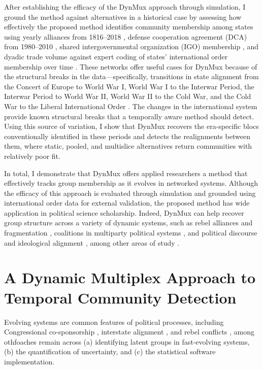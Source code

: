 \documentclass[11pt, letterpaper]{article}
\begin{document}
After establishing the efficacy of the DynMux approach through simulation, I ground the method against alternatives in a historical case by assessing how effectively the proposed method identifies community membership among states using yearly alliances from 1816--2018 \citep{leeds2002alliance}, defense cooperation agreement (DCA) from 1980--2010 \citep{kinne2020defense}, shared intergovernmental organization (IGO) membership \citep{pevehouse2020tracking, wallace1970intergovernmental}, and dyadic trade volume \citep{barbieri2009trading} against expert coding of states' international order membership over time \citep{braumoeller2019only}. These networks offer useful cases for DynMux because of the structural breaks in the data---specifically, transitions in state alignment from the Concert of Europe to World War I, World War I to the Interwar Period, the Interwar Period to World War II, World War II to the Cold War, and the Cold War to the Liberal International Order \citep{braumoeller2019only, ikenberry2018end}. The changes in the international system provide known structural breaks that a temporally aware method should detect. Using this source of variation, I show that DynMux recovers the era-specific blocs conventionally identified in these periods and detects the realignments between them, where static, pooled, and multislice alternatives return communities with relatively poor fit.

In total, I demonstrate that DynMux offers applied researchers a method that effectively tracks group membership as it evolves in networked systems. Although the efficacy of this approach is evaluated through simulation and grounded using international order data for external validation, the proposed method has wide application in political science scholarship. Indeed, DynMux can help recover group structure across a variety of dynamic systems, such as rebel alliances and fragmentation \citep{blair2022leadership, christia2012alliance, gade2019networks}, coalitions in multiparty political systems \citep{golder2012modeling, Samet2025AJPS, Volden2024ajps}, and political discourse and ideological alignment \citep{green2024rhetorical, naftel2025meet}, among other areas of study \citep{cao2009networks, Tavana2026AJPS}.


\section{A Dynamic Multiplex Approach to Temporal Community Detection}
Evolving systems are common features of political processes, including Congressional co-sponsorship \citep{craig2021takes, fowler2006connecting, victor2009social}, interstate alignment \citep{beardsley2024coevolution, gallop2021network, minhas2022taking}, and rebel conflicts \citep{dorff2020Nigeria, dorff2023network, vega2023measuring}, %
among othƒoaches remain across (a) identifying latent groups in fast-evolving systems, (b) the quantification of uncertainty, and (c) the statistical software implementation.
 
\end{document}

